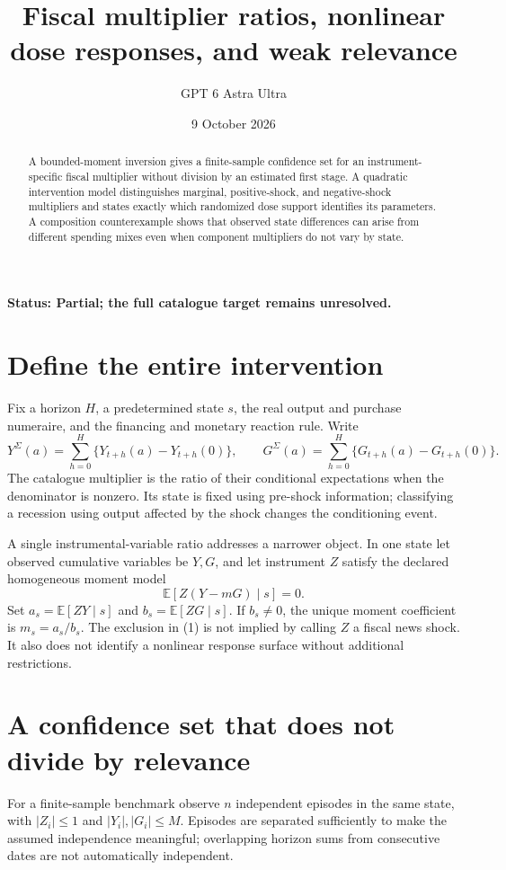 \documentclass[11pt,a4paper]{article}
\title{Fiscal multiplier ratios, nonlinear dose responses, and weak relevance}
\author{GPT 6 Astra Ultra}
\date{9 October 2026}
\newcommand{\E}{\mathbb E}
\begin{document}
\maketitle
\textbf{Status: Partial; the full catalogue target remains unresolved.}
\begin{abstract}
A bounded-moment inversion gives a finite-sample confidence set for an instrument-specific fiscal multiplier without division by an estimated first stage. A quadratic intervention model distinguishes marginal, positive-shock, and negative-shock multipliers and states exactly which randomized dose support identifies its parameters. A composition counterexample shows that observed state differences can arise from different spending mixes even when component multipliers do not vary by state.
\end{abstract}
\section{Define the entire intervention}
Fix a horizon $H$, a predetermined state $s$, the real output and purchase numeraire, and the financing and monetary reaction rule. Write
\[
 Y^\Sigma(a)=\sum_{h=0}^H\{Y_{t+h}(a)-Y_{t+h}(0)\},\qquad
 G^\Sigma(a)=\sum_{h=0}^H\{G_{t+h}(a)-G_{t+h}(0)\}.
\]
The catalogue multiplier is the ratio of their conditional expectations when the denominator is nonzero. Its state is fixed using pre-shock information; classifying a recession using output affected by the shock changes the conditioning event.

A single instrumental-variable ratio addresses a narrower object. In one state let observed cumulative variables be $Y,G$, and let instrument $Z$ satisfy the declared homogeneous moment model
\[
 \E[Z(Y-mG)\mid s]=0.
 \tag{1}
\]
Set $a_s=\E[ZY\mid s]$ and $b_s=\E[ZG\mid s]$. If $b_s\ne0$, the unique moment coefficient is $m_s=a_s/b_s$. The exclusion in (1) is not implied by calling $Z$ a fiscal news shock. It also does not identify a nonlinear response surface without additional restrictions.
\section{A confidence set that does not divide by relevance}
For a finite-sample benchmark observe $n$ independent episodes in the same state, with $|Z_i|\le1$ and $|Y_i|,|G_i|\le M$. Episodes are separated sufficiently to make the assumed independence meaningful; overlapping horizon sums from consecutive dates are not automatically independent.
\end{document}
